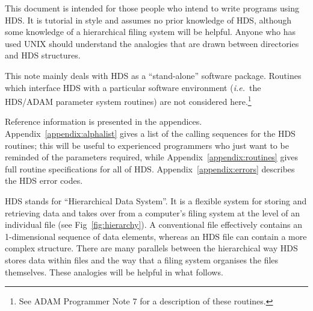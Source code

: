 \documentclass[twoside,11pt]{article}
\newcommand{\xref}[3]{#1}
\renewcommand{\_}{\texttt{\symbol{95}}}
\newcommand{\qt}[1]{``#1''}
\newcommand{\st}[1]{{\em{#1}}}
\newcommand{\qt}[1]{{\tt{"}}#1{\tt{"}}}
\begin{document}
This document is intended for those people who intend to write
programs using HDS. It is tutorial in style and assumes no prior
knowledge of HDS, although some knowledge of a hierarchical filing
system will be helpful. Anyone who has used UNIX should understand the
analogies that are drawn between directories and HDS structures.

This note mainly deals with HDS as a \qt{stand-alone} software
package. Routines which interface HDS with a particular software
environment (\st{i.e.}\ the HDS/\xref{ADAM}{sg4}{} parameter system
routines) are not considered here.\footnote{See ADAM Programmer Note 7
for a description of these routines.}

Reference information is presented in the appendices.
Appendix~\ref{appendix:alphalist} gives a list of the calling
sequences for the HDS routines; this will be useful to experienced
programmers who just want to be reminded of the parameters required,
while Appendix~\ref{appendix:routines} gives full routine
specifications for all of HDS.  Appendix~\ref{appendix:errors}
describes the HDS error codes.

HDS stands for \qt{Hierarchical Data System}. It is a flexible system
for storing and retrieving data and takes over from a computer's
filing system at the level of an individual file (see
Fig~\ref{fig:hierarchy}). A conventional file effectively contains an
1-dimensional sequence of data elements, whereas an HDS file can
contain a more complex structure. There are many parallels between the
hierarchical way HDS stores data within files and the way that a
filing system organises the files themselves. These analogies will be
helpful in what follows.
\end{document}
